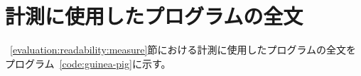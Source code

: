 \appendix
\section{計測に使用したプログラムの全文}
\label{appendix:whole-program}

~\ref{evaluation:readability:measure}節における計測に使用したプログラムの全文をプログラム~\ref{code:guinea-pig}に示す。

